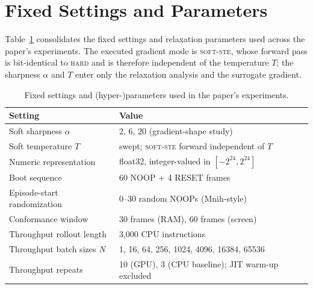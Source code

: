 \documentclass[letterpaper]{article} %
\begin{document}
\section{Fixed Settings and Parameters}

Table~\ref{tab:s-params} consolidates the fixed settings and relaxation
parameters used across the paper's experiments. The executed gradient mode is
\textsc{soft-ste}, whose forward pass is bit-identical to \textsc{hard} and is
therefore independent of the temperature $T$; the sharpness $\alpha$ and $T$
enter only the relaxation analysis and the surrogate gradient.

\begin{table}[h]
\centering
\caption{Fixed settings and (hyper-)parameters used in the paper's experiments.}
\label{tab:s-params}
\small
\setlength{\tabcolsep}{5pt}
\begin{tabular}{@{}l p{}@{}}
\toprule
Setting & Value\\
\midrule
Soft sharpness $\alpha$       & $2,\,6,\,20$ (gradient-shape study)\\
Soft temperature $T$          & swept; \textsc{soft-ste} forward independent of $T$\\
Numeric representation        & float32, integer-valued in $[-2^{24},2^{24}]$\\
Boot sequence                 & 60 NOOP + 4 RESET frames\\
Episode-start randomization   & 0--30 random NOOPs (Mnih-style)\\
Conformance window            & 30 frames (RAM), 60 frames (screen)\\
Throughput rollout length     & 3{,}000 CPU instructions\\
Throughput batch sizes $N$    & 1, 16, 64, 256, 1024, 4096, 16384, 65536\\
Throughput repeats            & 10 (GPU), 3 (CPU baseline); JIT warm-up excluded\\
\bottomrule
\end{tabular}
\end{table}


\end{document}
